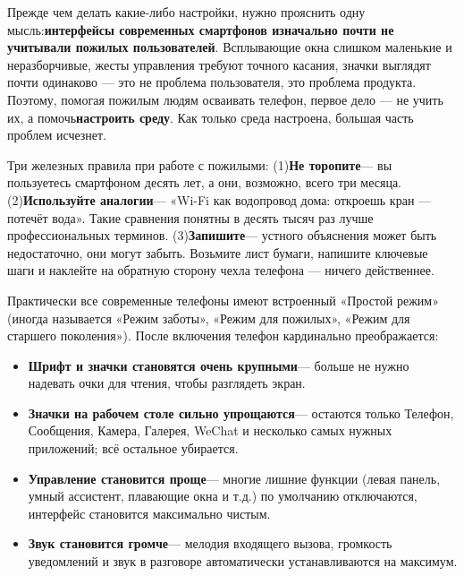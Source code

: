 


Прежде чем делать какие-либо настройки, нужно прояснить одну мысль:\textbf{интерфейсы современных смартфонов изначально почти не учитывали пожилых пользователей}. Всплывающие окна слишком маленькие и неразборчивые, жесты управления требуют точного касания, значки выглядят почти одинаково — это не проблема пользователя, это проблема продукта. Поэтому, помогая пожилым людям осваивать телефон, первое дело — не учить их, а помочь\textbf{настроить среду}. Как только среда настроена, большая часть проблем исчезнет.

Три железных правила при работе с пожилыми: (1)\textbf{Не торопите}— вы пользуетесь смартфоном десять лет, а они, возможно, всего три месяца. (2)\textbf{Используйте аналогии}— «Wi-Fi как водопровод дома: откроешь кран — потечёт вода». Такие сравнения понятны в десять тысяч раз лучше профессиональных терминов. (3)\textbf{Запишите}— устного объяснения может быть недостаточно, они могут забыть. Возьмите лист бумаги, напишите ключевые шаги и наклейте на обратную сторону чехла телефона — ничего действеннее.


Практически все современные телефоны имеют встроенный «Простой режим» (иногда называется «Режим заботы», «Режим для пожилых», «Режим для старшего поколения»). После включения телефон кардинально преображается:

\begin{itemize}
  \item \textbf{Шрифт и значки становятся очень крупными}— больше не нужно надевать очки для чтения, чтобы разглядеть экран.
  \item \textbf{Значки на рабочем столе сильно упрощаются}— остаются только Телефон, Сообщения, Камера, Галерея, WeChat и несколько самых нужных приложений; всё остальное убирается.
  \item \textbf{Управление становится проще}— многие лишние функции (левая панель, умный ассистент, плавающие окна и т.д.) по умолчанию отключаются, интерфейс становится максимально чистым.
  \item \textbf{Звук становится громче}— мелодия входящего вызова, громкость уведомлений и звук в разговоре автоматически устанавливаются на максимум.
\end{itemize}

